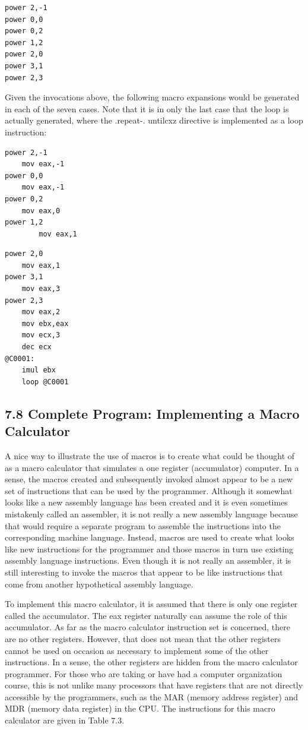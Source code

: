\documentclass[10pt]{article}
\begin{document}
\begin{verbatim}
power 2,-1
power 0,0
power 0,2
power 1,2
power 2,0
power 3,1
power 2,3
\end{verbatim}

Given the invocations above, the following macro expansions would be generated in each of the seven cases. Note that it is in only the last case that the loop is actually generated, where the .repeat-. untilcxz directive is implemented as a loop instruction:

\begin{verbatim}
power 2,-1
    mov eax,-1
power 0,0
    mov eax,-1
power 0,2
    mov eax,0
power 1,2
        mov eax,1
\end{verbatim}

\begin{verbatim}
power 2,0
    mov eax,1
power 3,1
    mov eax,3
power 2,3
    mov eax,2
    mov ebx,eax
    mov ecx,3
    dec ecx
@C0001:
    imul ebx
    loop @C0001
\end{verbatim}

\subsection*{7.8 Complete Program: Implementing a Macro Calculator}
A nice way to illustrate the use of macros is to create what could be thought of as a macro calculator that simulates a one register (accumulator) computer. In a sense, the macros created and subsequently invoked almost appear to be a new set of instructions that can be used by the programmer. Although it somewhat looks like a new assembly language has been created and it is even sometimes mistakenly called an assembler, it is not really a new assembly language because that would require a separate program to assemble the instructions into the corresponding machine language. Instead, macros are used to create what looks like new instructions for the programmer and those macros in turn use existing assembly language instructions. Even though it is not really an assembler, it is still interesting to invoke the macros that appear to be like instructions that come from another hypothetical assembly language.

To implement this macro calculator, it is assumed that there is only one register called the accumulator. The eax register naturally can assume the role of this accumulator. As far as the macro calculator instruction set is concerned, there are no other registers. However, that does not mean that the other registers cannot be used on occasion as necessary to implement some of the other instructions. In a sense, the other registers are hidden from the macro calculator programmer. For those who are taking or have had a computer organization course, this is not unlike many processors that have registers that are not directly accessible by the programmers, such as the MAR (memory address register) and MDR (memory data register) in the CPU. The instructions for this macro calculator are given in Table 7.3.
\end{document}
